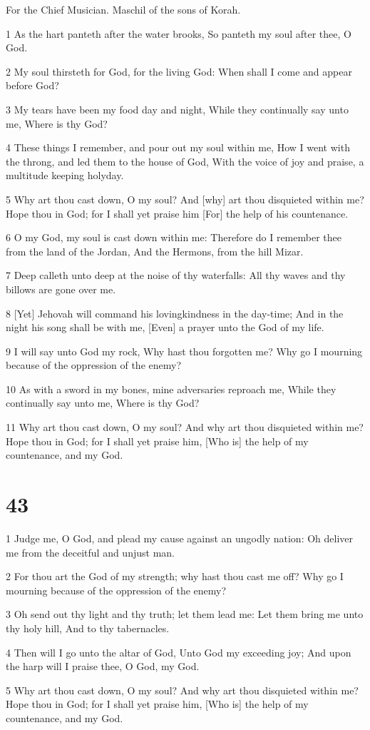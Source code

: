 \par For the Chief Musician. Maschil of the sons of Korah.

\par 1 As the hart panteth after the water brooks, So panteth my soul after thee, O God.
\par 2 My soul thirsteth for God, for the living God: When shall I come and appear before God?
\par 3 My tears have been my food day and night, While they continually say unto me, Where is thy God?
\par 4 These things I remember, and pour out my soul within me, How I went with the throng, and led them to the house of God, With the voice of joy and praise, a multitude keeping holyday.
\par 5 Why art thou cast down, O my soul? And [why] art thou disquieted within me? Hope thou in God; for I shall yet praise him [For] the help of his countenance.
\par 6 O my God, my soul is cast down within me: Therefore do I remember thee from the land of the Jordan, And the Hermons, from the hill Mizar.
\par 7 Deep calleth unto deep at the noise of thy waterfalls: All thy waves and thy billows are gone over me.
\par 8 [Yet] Jehovah will command his lovingkindness in the day-time; And in the night his song shall be with me, [Even] a prayer unto the God of my life.
\par 9 I will say unto God my rock, Why hast thou forgotten me? Why go I mourning because of the oppression of the enemy?
\par 10 As with a sword in my bones, mine adversaries reproach me, While they continually say unto me, Where is thy God?
\par 11 Why art thou cast down, O my soul? And why art thou disquieted within me? Hope thou in God; for I shall yet praise him, [Who is] the help of my countenance, and my God.

\chapter{43}

\par 1 Judge me, O God, and plead my cause against an ungodly nation: Oh deliver me from the deceitful and unjust man.
\par 2 For thou art the God of my strength; why hast thou cast me off? Why go I mourning because of the oppression of the enemy?
\par 3 Oh send out thy light and thy truth; let them lead me: Let them bring me unto thy holy hill, And to thy tabernacles.
\par 4 Then will I go unto the altar of God, Unto God my exceeding joy; And upon the harp will I praise thee, O God, my God.
\par 5 Why art thou cast down, O my soul? And why art thou disquieted within me? Hope thou in God; for I shall yet praise him, [Who is] the help of my countenance, and my God.

